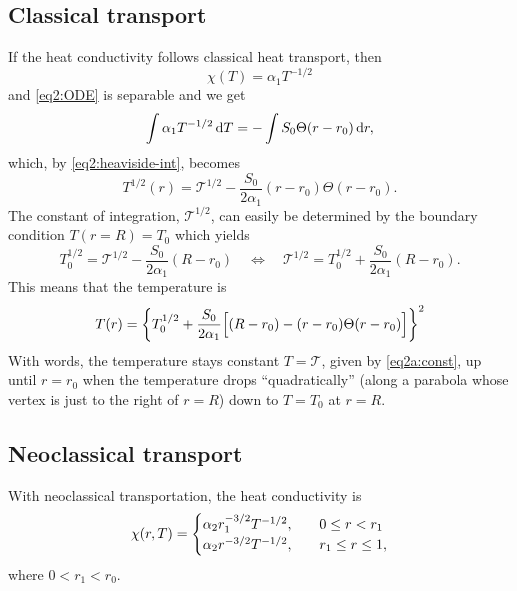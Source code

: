 \documentclass[11pt,a4paper, 
swedish, english %
]{article}
\begin{document}
\subsection{Classical transport}
If the heat conductivity follows classical heat transport, then
\begin{equation}
\chi(T)=\alpha_1T^{-1/2}
\end{equation}
and \eqref{eq2:ODE} is separable and we get
\begin{equation}
\int\alpha_1T^{-1/2}\id{T}=-\int S_0\Theta(r-r_0)\id{r},
\end{equation}
which, by \eqref{eq2:heaviside-int}, becomes
\begin{equation}
T^{1/2}(r)=\mathcal{T}^{1/2}
-\frac{S_0}{2\alpha_1}(r-r_0)\Theta(r-r_0).
\end{equation}
The constant of integration, $\mathcal{T}^{1/2}$, can easily be
determined by the boundary condition $T(r=R)=T_0$ which yields
\begin{equation}\label{eq2a:const}
T_0^{1/2}=\mathcal{T}^{1/2}-\frac{S_0}{2\alpha_1}(R-r_0)
\quad\Longleftrightarrow\quad
\mathcal{T}^{1/2}=T_0^{1/2}+\frac{S_0}{2\alpha_1}(R-r_0).
\end{equation}
This means that the temperature is
\begin{equation}
T(r)=\qty{T_0^{1/2}+\frac{S_0}{2\alpha_1}
\Big[(R-r_0)-(r-r_0)\Theta(r-r_0)\Big]}^2
\end{equation}
With words, the temperature stays constant $T=\mathcal{T}$, given by
\eqref{eq2a:const}, up until $r=r_0$ when the temperature drops 
``quadratically'' (along a parabola whose vertex is just to the right
of $r=R$) down to $T=T_0$ at $r=R$. 

\subsection{Neoclassical transport}
With neoclassical transportation, the heat conductivity is
\begin{equation}
\chi(r, T)=
\begin{cases}
\alpha_2 r_1^{-3/2}T^{-1/2}\qc&0\le r<r_1\\
\alpha_2 r^{-3/2}T^{-1/2}\qc& r_1\le r\le1,
\end{cases}
\end{equation}
where $0<r_1<r_0$. 
\end{document}
